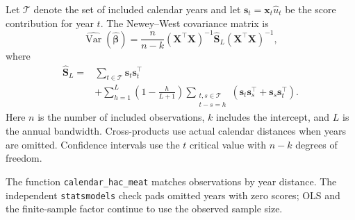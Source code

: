 \documentclass[11pt,letterpaper]{article}
\begin{document}
Let $\mathcal T$ denote the set of included calendar years and let
$\mathbf s_t=\mathbf x_t\widehat u_t$ be the score contribution for year $t$.
The Newey--West covariance matrix is
\begin{equation}\label{eq:hac}
\widehat{\operatorname{Var}}(\widehat{\bm\beta})
=\frac{n}{n-k}(\mathbf X^{\top}\mathbf X)^{-1}\widehat{\mathbf S}_L(\mathbf X^{\top}\mathbf X)^{-1},
\end{equation}
where
\begin{equation}\label{eq:meat}
\begin{aligned}
\widehat{\mathbf S}_L={}&\sum_{t\in\mathcal T}\mathbf s_t\mathbf s_t^{\top}\\
&+\sum_{h=1}^{L}\left(1-\frac{h}{L+1}\right)
\sum_{\substack{t,s\in\mathcal T\\t-s=h}}
\left(\mathbf s_t\mathbf s_s^{\top}+\mathbf s_s\mathbf s_t^{\top}\right).
\end{aligned}
\end{equation}
Here $n$ is the number of included observations, $k$ includes the intercept, and $L$ is
the annual bandwidth. Cross-products use actual calendar distances when years are
omitted. Confidence intervals use the $t$ critical value with $n-k$ degrees of freedom.

The function \texttt{calendar\_hac\_meat} matches observations by year distance. The independent \texttt{statsmodels} check pads omitted years with zero scores; OLS and the finite-sample factor continue to use the observed sample size.
\end{document}
